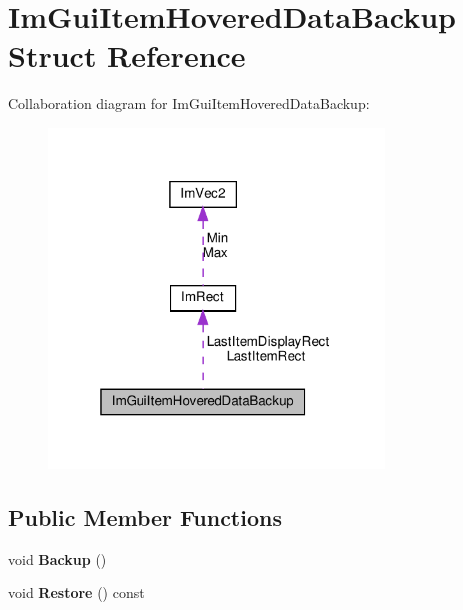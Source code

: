 \hypertarget{structImGuiItemHoveredDataBackup}{}\section{Im\+Gui\+Item\+Hovered\+Data\+Backup Struct Reference}
\label{structImGuiItemHoveredDataBackup}


Collaboration diagram for Im\+Gui\+Item\+Hovered\+Data\+Backup\+:\nopagebreak
\begin{figure}[H]
\begin{center}
\leavevmode
\includegraphics[width=253pt]{structImGuiItemHoveredDataBackup__coll__graph}
\end{center}
\end{figure}
\subsection*{Public Member Functions}
\begin{DoxyCompactItemize}
\item 
\mbox{\label{structImGuiItemHoveredDataBackup_a2084500d9cbc9455e52fbe87c95f2315}} 
void {\bfseries Backup} ()
\item 
\mbox{\label{structImGuiItemHoveredDataBackup_ae812e9cff1c84c7b438a5af502d778f5}} 
void {\bfseries Restore} () const
\end{DoxyCompactItemize}
